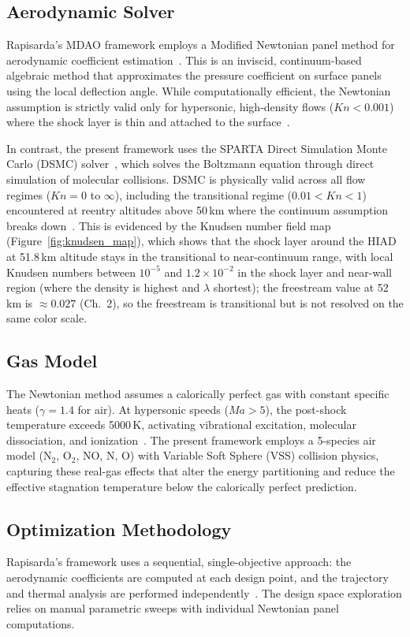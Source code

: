 \subsection{Aerodynamic Solver}
Rapisarda's MDAO framework employs a Modified Newtonian panel method for aerodynamic coefficient estimation~\cite{rapisarda2023mdao}. This is an inviscid, continuum-based algebraic method that approximates the pressure coefficient on surface panels using the local deflection angle. While computationally efficient, the Newtonian assumption is strictly valid only for hypersonic, high-density flows ($Kn < 0.001$) where the shock layer is thin and attached to the surface~\cite{AndersonHypersonic}.

In contrast, the present framework uses the SPARTA Direct Simulation Monte Carlo (DSMC) solver~\cite{plimpton2014sparta}, which solves the Boltzmann equation through direct simulation of molecular collisions. DSMC is physically valid across all flow regimes ($Kn = 0$ to $\infty$), including the transitional regime ($0.01 < Kn < 1$) encountered at reentry altitudes above 50\,km where the continuum assumption breaks down~\cite{bird1994molecular}. This is evidenced by the Knudsen number field map (Figure~\ref{fig:knudsen_map}), which shows that the shock layer around the HIAD at 51.8\,km altitude stays in the transitional to near-continuum range, with local Knudsen numbers between $10^{-5}$ and $1.2\times10^{-2}$ in the shock layer and near-wall region (where the density is highest and $\lambda$ shortest); the freestream value at 52\,km is $\approx 0.027$ (Ch.~2), so the freestream is transitional but is not resolved on the same color scale.

\subsection{Gas Model}
The Newtonian method assumes a calorically perfect gas with constant specific heats ($\gamma = 1.4$ for air). At hypersonic speeds ($Ma > 5$), the post-shock temperature exceeds 5000\,K, activating vibrational excitation, molecular dissociation, and ionization~\cite{AndersonHypersonic}. The present framework employs a 5-species air model (N$_2$, O$_2$, NO, N, O) with Variable Soft Sphere (VSS) collision physics, capturing these real-gas effects that alter the energy partitioning and reduce the effective stagnation temperature below the calorically perfect prediction.

\subsection{Optimization Methodology}
Rapisarda's framework uses a sequential, single-objective approach: the aerodynamic coefficients are computed at each design point, and the trajectory and thermal analysis are performed independently~\cite{rapisarda2023mdao}. The design space exploration relies on manual parametric sweeps with individual Newtonian panel computations.

